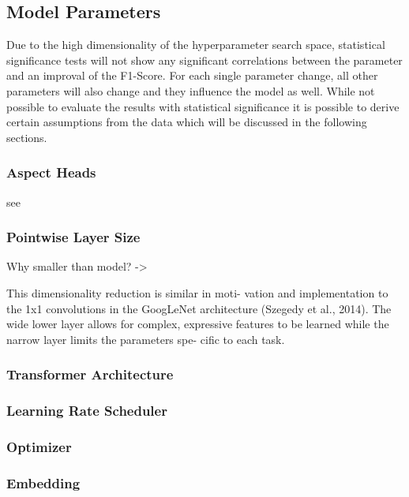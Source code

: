 \subsection{Model Parameters}

Due to the high dimensionality of the hyperparameter search space, statistical significance tests will not show any significant correlations between the parameter and an improval of the F1-Score. For each single parameter change, all other parameters will also change and they influence the model as well. While not possible to evaluate the results with statistical significance it is possible to derive certain assumptions from the data which will be discussed in the following sections.

\subsubsection{Aspect Heads}

see \cite{Ramsundar2015}

\subsubsection{Pointwise Layer Size}

Why smaller than model? -> 

This dimensionality reduction is similar in moti- vation and implementation to the 1x1 convolutions in the GoogLeNet architecture (Szegedy et al., 2014). The wide lower layer allows for complex, expressive features to be learned while the narrow layer limits the parameters spe- cific to each task.

\cite{Ramsundar2015}

\subsubsection{Transformer Architecture}

\subsubsection{Learning Rate Scheduler}

\subsubsection{Optimizer}

\subsubsection{Embedding}


